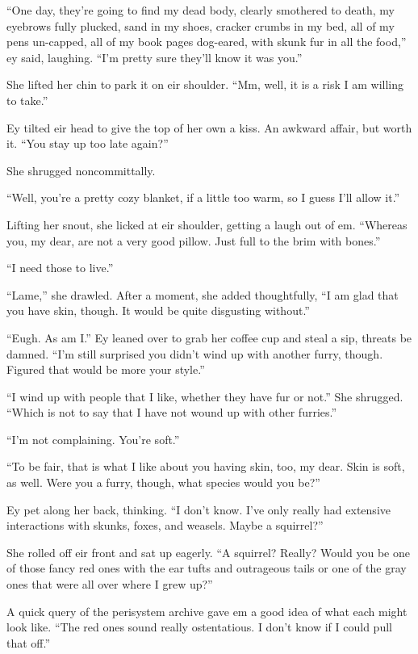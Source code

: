 ``One day, they're going to find my dead body, clearly smothered to death, my eyebrows fully plucked, sand in my shoes, cracker crumbs in my bed, all of my pens un-capped, all of my book pages dog-eared, with skunk fur in all the food,'' ey said, laughing. ``I'm pretty sure they'll know it was you.''

She lifted her chin to park it on eir shoulder. ``Mm, well, it is a risk I am willing to take.''

Ey tilted eir head to give the top of her own a kiss. An awkward affair, but worth it. ``You stay up too late again?''

She shrugged noncommittally.

``Well, you're a pretty cozy blanket, if a little too warm, so I guess I'll allow it.''

Lifting her snout, she licked at eir shoulder, getting a laugh out of em. ``Whereas you, my dear, are not a very good pillow. Just full to the brim with bones.''

``I need those to live.''

``Lame,'' she drawled. After a moment, she added thoughtfully, ``I am glad that you have skin, though. It would be quite disgusting without.''

``Eugh. As am I.'' Ey leaned over to grab her coffee cup and steal a sip, threats be damned. ``I'm still surprised you didn't wind up with another furry, though. Figured that would be more your style.''

``I wind up with people that I like, whether they have fur or not.'' She shrugged. ``Which is not to say that I have not wound up with other furries.''

``I'm not complaining. You're soft.''

``To be fair, that is what I like about you having skin, too, my dear. Skin is soft, as well. Were you a furry, though, what species would you be?''

Ey pet along her back, thinking. ``I don't know. I've only really had extensive interactions with skunks, foxes, and weasels. Maybe a squirrel?''

She rolled off eir front and sat up eagerly. ``A squirrel? Really? Would you be one of those fancy red ones with the ear tufts and outrageous tails or one of the gray ones that were all over where I grew up?''

A quick query of the perisystem archive gave em a good idea of what each might look like. ``The red ones sound really ostentatious. I don't know if I could pull that off.''

